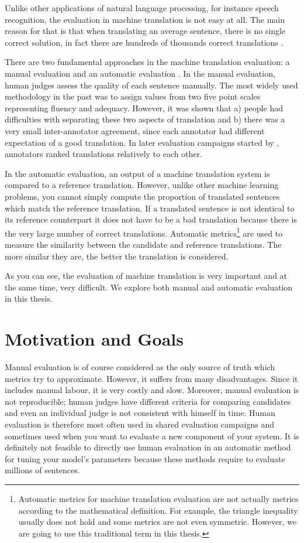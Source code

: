 Unlike other applications of natural language processing, for instance speech
recognition, the evaluation in machine translation is not easy at all. The main
reason for that is that when translating an average sentence, there is no single
correct solution, in fact there are hundreds of thousands correct translations
.

There are two fundamental approaches in the machine translation evaluation: a
manual evaluation and an automatic evaluation . In
the manual evaluation, human judges assess the quality of each sentence
manually. The most widely used methodology in the past was to assign values
from two five point scales representing fluency and adequacy. However, it was
shown that a) people had difficulties with separating these two aspects of
translation and b) there was a very small inter-annotator agreement, since each
annotator had different expectation of a good translation. In later evaluation
campaigns started by , annotators ranked
translations relatively to each other.

In the automatic evaluation, an output of a machine translation system is
compared to a reference translation. However, unlike other machine learning
problems, you cannot simply compute the proportion of translated sentences
which match the reference translation. If a translated sentence is not
identical to its reference counterpart it does not have to be a bad translation
because there is the very large number of correct translations. Automatic
metrics\footnote{Automatic metrics for machine translation evaluation are not
actually metrics according to the mathematical definition. For example, the
triangle inequality usually does not hold and some metrics are not even
symmetric. However, we are going to use this traditional term in this thesis.}
are used to measure the similarity between the candidate and reference
translations. The more similar they are, the better the translation is
considered.

As you can see, the evaluation of machine translation is very important and at
the same time, very difficult. We explore both manual and automatic evaluation
in this thesis.

\section{Motivation and Goals}

Manual evaluation is of course considered as the only source of truth which
metrics try to approximate. However, it suffers from many disadvantages. Since
it includes manual labour, it is very costly and slow. Moreover, manual
evaluation is not reproducible; human judges have different criteria for
comparing candidates and even an individual judge is not consistent with
himself in time. Human evaluation is therefore most often used in shared
evaluation campaigns and sometimes used when you want to evaluate a new component
of your system. It is definitely not feasible to directly use human evaluation
in an automatic method for tuning your model's parameters because these methods
require to evaluate millions of sentences.

